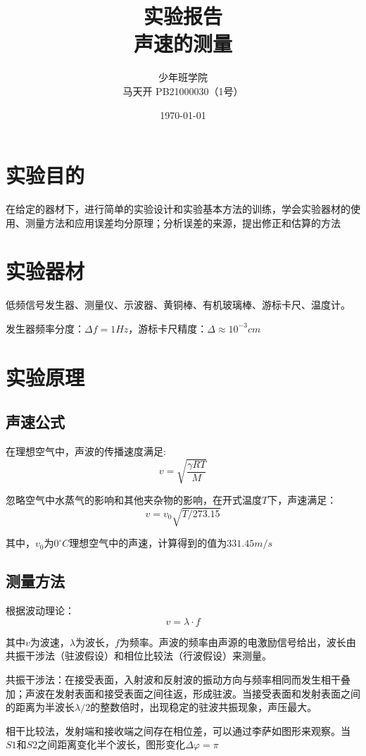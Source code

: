 \documentclass[a4paper]{ltxdoc}
\title{实验报告\\声速的测量}
\author{少年班学院\\马天开 PB21000030（1号）}
\date{\today}
\begin{document}
\begin{multicols}{2}
    \maketitle
    \section{实验目的}
    在给定的器材下，进行简单的实验设计和实验基本方法的训练，学会实验器材的使用、测量方法和应用误差均分原理；分析误差的来源，提出修正和估算的方法
    \section{实验器材}
    低频信号发生器、测量仪、示波器、黄铜棒、有机玻璃棒、游标卡尺、温度计。

    发生器频率分度：$\Delta f =1Hz$，游标卡尺精度：$\Delta \approx 10^{-3} cm$
    \section{实验原理}
    \subsection{声速公式}
    在理想空气中，声波的传播速度满足:
    $$
        v=\sqrt{\dfrac{\gamma R T}{M}}
    $$

    忽略空气中水蒸气的影响和其他夹杂物的影响，在开式温度$T$下，声速满足：
    $$
        v = v_0 \sqrt{T / 273.15}
    $$

    其中，$v_0$为$0^\circ C$理想空气中的声速，计算得到的值为$331.45 m/s$

    \subsection{测量方法}

    根据波动理论：
    $$
        v = \lambda \cdot f
    $$

    其中$v$为波速，$\lambda$为波长，$f$为频率。声波的频率由声源的电激励信号给出，波长由共振干涉法（驻波假设）和相位比较法（行波假设）来测量。

    共振干涉法：在接受表面，入射波和反射波的振动方向与频率相同而发生相干叠加；声波在发射表面和接受表面之间往返，形成驻波。当接受表面和发射表面之间的距离为半波长$\lambda /2$的整数倍时，出现稳定的驻波共振现象，声压最大。

    相干比较法，发射端和接收端之间存在相位差，可以通过李萨如图形来观察。当$S1$和$S2$之间距离变化半个波长，图形变化$\Delta \varphi = \pi$


\end{multicols}
\end{document}
